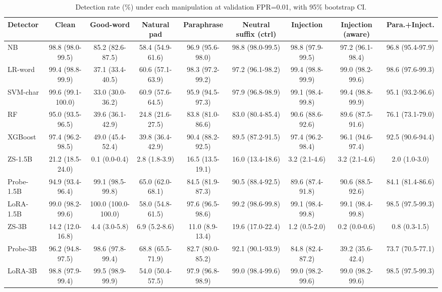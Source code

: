 \begin{table}[t]
\centering
\caption{Detection rate (\%) under each manipulation at validation FPR=0.01, with 95\% bootstrap CI.}
\label{tab:dr}
\footnotesize
\begin{tabular}{lcccccccc}
\toprule
\textbf{Detector} & \textbf{Clean} & \textbf{Good-word} & \textbf{Natural pad} & \textbf{Paraphrase} & \textbf{Neutral suffix (ctrl)} & \textbf{Injection} & \textbf{Injection (aware)} & \textbf{Para.+Inject.} \\
\midrule
NB & 98.8 (98.0-99.5) & 85.2 (82.6-87.5) & 58.4 (54.9-61.6) & 96.9 (95.6-98.0) & 98.8 (98.0-99.5) & 98.8 (97.9-99.5) & 97.2 (96.1-98.4) & 96.8 (95.4-97.9) \\
LR-word & 99.4 (98.8-99.9) & 37.1 (33.4-40.5) & 60.6 (57.1-63.9) & 98.3 (97.2-99.2) & 97.2 (96.1-98.2) & 99.4 (98.8-99.9) & 99.0 (98.2-99.6) & 98.6 (97.6-99.3) \\
SVM-char & 99.6 (99.1-100.0) & 33.0 (30.0-36.2) & 60.9 (57.6-64.5) & 95.9 (94.5-97.3) & 97.9 (96.8-98.9) & 99.1 (98.4-99.8) & 99.4 (98.8-99.9) & 95.1 (93.2-96.6) \\
RF & 95.0 (93.5-96.5) & 39.6 (36.1-42.9) & 24.8 (21.6-27.5) & 83.8 (81.0-86.6) & 83.0 (80.4-85.4) & 90.6 (88.6-92.6) & 89.6 (87.5-91.6) & 76.1 (73.1-79.0) \\
XGBoost & 97.4 (96.2-98.5) & 49.0 (45.4-52.4) & 39.8 (36.4-42.9) & 90.4 (88.2-92.5) & 89.5 (87.2-91.5) & 97.4 (96.2-98.4) & 96.1 (94.6-97.4) & 92.5 (90.6-94.4) \\
ZS-1.5B & 21.2 (18.5-24.0) & 0.1 (0.0-0.4) & 2.8 (1.8-3.9) & 16.5 (13.5-19.1) & 16.0 (13.4-18.6) & 3.2 (2.1-4.6) & 3.2 (2.1-4.6) & 2.0 (1.0-3.0) \\
Probe-1.5B & 94.9 (93.4-96.4) & 99.1 (98.5-99.8) & 65.0 (62.0-68.1) & 84.5 (81.9-87.3) & 90.5 (88.4-92.5) & 89.6 (87.4-91.8) & 90.6 (88.5-92.6) & 84.1 (81.4-86.6) \\
LoRA-1.5B & 99.0 (98.2-99.6) & 100.0 (100.0-100.0) & 58.0 (54.8-61.5) & 97.6 (96.5-98.6) & 99.2 (98.6-99.8) & 99.1 (98.4-99.8) & 99.1 (98.4-99.8) & 98.5 (97.5-99.3) \\
ZS-3B & 14.2 (12.0-16.8) & 4.4 (3.0-5.8) & 6.9 (5.2-8.6) & 11.0 (8.9-13.4) & 19.6 (17.0-22.4) & 1.2 (0.5-2.0) & 0.2 (0.0-0.6) & 0.8 (0.3-1.5) \\
Probe-3B & 96.2 (94.8-97.5) & 98.6 (97.8-99.4) & 68.8 (65.5-71.9) & 82.7 (80.0-85.2) & 92.1 (90.1-93.9) & 84.8 (82.4-87.2) & 39.2 (35.6-42.4) & 73.7 (70.5-77.1) \\
LoRA-3B & 98.8 (97.9-99.4) & 99.5 (98.9-99.9) & 54.0 (50.4-57.5) & 97.9 (96.8-98.9) & 99.0 (98.4-99.6) & 99.0 (98.2-99.6) & 99.0 (98.2-99.6) & 98.5 (97.5-99.3) \\

\end{tabular}
\end{table}
